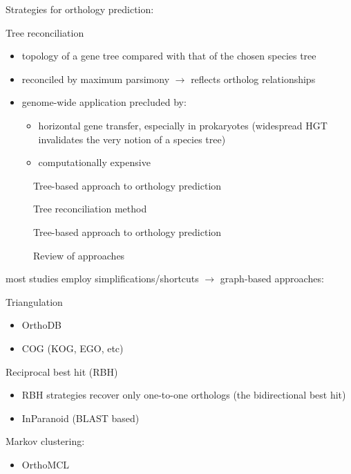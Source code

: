 Strategies for orthology prediction:

Tree reconciliation

\begin{itemize}
	\item topology of a gene tree compared with that of the chosen species tree
	\item reconciled by maximum parsimony $\rightarrow$ reflects ortholog
		relationships
	\item genome-wide application precluded by:
	\begin{itemize}
		\item horizontal gene transfer, especially in prokaryotes (widespread HGT
			invalidates the very notion of a species tree)
		\item computationally expensive
	\end{itemize}
\end{itemize}

\begin{description}
	\item[\cite{mirkin1995}] Tree-based approach to orthology prediction
	\item[\cite{page1998}] Tree reconciliation method
	\item[\cite{yuan1998}] Tree-based approach to orthology prediction
	\item[\cite{kuzniar2008}] Review of approaches
\end{description}

most studies employ simplifications/shortcuts $\rightarrow$ graph-based approaches:

Triangulation

\begin{itemize}
	\item OrthoDB 
	\item COG (KOG, EGO, etc)
\end{itemize}

Reciprocal best hit (RBH) 

\begin{itemize}
	\item RBH strategies recover only one-to-one orthologs (the bidirectional best
		hit)
	\item InParanoid (BLAST based)
\end{itemize}

Markov clustering:

\begin{itemize}
	\item OrthoMCL
\end{itemize}

